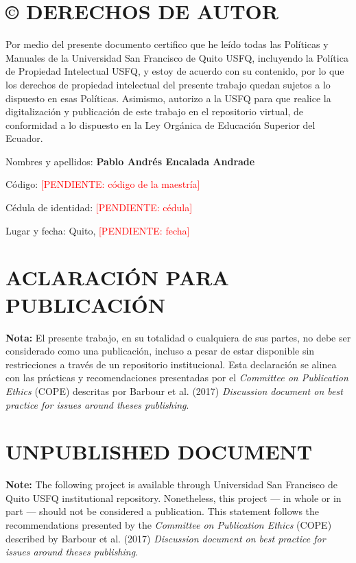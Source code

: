 \documentclass[12pt,a4paper,oneside]{report}
\newcommand{\pend}[1]{\textcolor{red}{\small[PENDIENTE: #1]}}
\newcommand{\elAutor}{Pablo Andrés Encalada Andrade}
\newcommand{\elCodigo}{\pend{código de la maestría}}
\newcommand{\laCedula}{\pend{cédula}}
\newcommand{\laFecha}{Quito, \pend{fecha}}
\begin{document}
\thispagestyle{empty}
\section*{\centering © DERECHOS DE AUTOR}
\noindent
Por medio del presente documento certifico que he leído todas las Políticas y Manuales
de la Universidad San Francisco de Quito USFQ, incluyendo la Política de Propiedad
Intelectual USFQ, y estoy de acuerdo con su contenido, por lo que los derechos de
propiedad intelectual del presente trabajo quedan sujetos a lo dispuesto en esas
Políticas. Asimismo, autorizo a la USFQ para que realice la digitalización y publicación
de este trabajo en el repositorio virtual, de conformidad a lo dispuesto en la Ley
Orgánica de Educación Superior del Ecuador.

\vspace{1cm}
\noindent Nombres y apellidos: \textbf{\elAutor}

\vspace{0.4cm}
\noindent Código: \elCodigo

\vspace{0.4cm}
\noindent Cédula de identidad: \laCedula

\vspace{0.4cm}
\noindent Lugar y fecha: \laFecha
\clearpage

\thispagestyle{empty}
\section*{\centering ACLARACIÓN PARA PUBLICACIÓN}
\noindent
\textbf{Nota:} El presente trabajo, en su totalidad o cualquiera de sus partes, no debe
ser considerado como una publicación, incluso a pesar de estar disponible sin
restricciones a través de un repositorio institucional. Esta declaración se alinea con
las prácticas y recomendaciones presentadas por el \emph{Committee on Publication Ethics}
(COPE) descritas por Barbour et al. (2017) \emph{Discussion document on best practice for
issues around theses publishing}.

\vspace{1.2cm}
\section*{\centering UNPUBLISHED DOCUMENT}
\noindent
\textbf{Note:} The following project is available through Universidad San Francisco de
Quito USFQ institutional repository. Nonetheless, this project --- in whole or in part
--- should not be considered a publication. This statement follows the recommendations
presented by the \emph{Committee on Publication Ethics} (COPE) described by Barbour
et al. (2017) \emph{Discussion document on best practice for issues around theses
publishing}.
\clearpage
\end{document}
